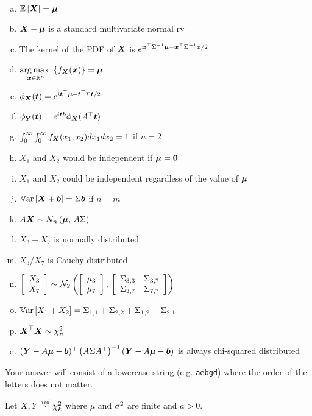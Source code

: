 \documentclass[12pt,landscape]{article}
\newcommand{\instr}{\small Your answer will consist of a lowercase string (e.g. \texttt{aebgd}) where the order of the letters does not matter. \normalsize}
\begin{document}
\begin{enumerate}[(a)]
\item $\mathbb{E}\left[\boldsymbol{X}\right] = \boldsymbol{\mu}$
\item $\boldsymbol{X} - \boldsymbol{\mu}$ is a standard multivariate normal rv
\item The kernel of the PDF of $\boldsymbol{X}$ is $e^{\boldsymbol{x}^\top \Sigma^{-1} \boldsymbol{\mu} - \boldsymbol{x}^\top \Sigma^{-1} \boldsymbol{x} / 2}$
\item $\displaystyle\operatorname*{arg\,max~}_{\boldsymbol{x} \in \mathbb{R}^n}\left\{f_{\boldsymbol{X}}(\boldsymbol{x})\right\} = \boldsymbol{\mu}$
\item $\phi_{\boldsymbol{X}}(\boldsymbol{t}) = e^{i\boldsymbol{t}^\top \boldsymbol{\mu} - \boldsymbol{t}^\top \Sigma \boldsymbol{t} / 2}$
\item $\phi_{\boldsymbol{Y}}(\boldsymbol{t}) = e^{i\boldsymbol{t} \boldsymbol{b}} \phi_{\boldsymbol{X}}(A^\top\boldsymbol{t})$
\item $\int_0^\infty \int_0^\infty f_{\boldsymbol{X}}(x_1,x_2) dx_1 dx_2 = 1$ if $n=2$
\item $X_1$ and $X_2$ would be independent if $\boldsymbol{\mu} = \boldsymbol{0}$
\item $X_1$ and $X_2$ could be independent regardless of the value of $\boldsymbol{\mu}$
\item $\mathbb{V}\text{ar}\left[\boldsymbol{X} + \boldsymbol{b}\right] = \Sigma\boldsymbol{b}$ if $n=m$
\item $A\boldsymbol{X} \sim \mathcal{N}_{n}\left(\boldsymbol{\mu},\,A\Sigma\right)$
\item $X_3 + X_7$ is normally distributed
\item $X_3 / X_7$ is Cauchy distributed
\item $\left[\begin{array}{c} X_3 \\ X_7 \end{array}\right] \sim \mathcal{N}_{2}\left(\left[\begin{array}{c} \mu_3 \\ \mu_7 \end{array}\right],\,\left[\begin{array}{cc} \Sigma_{3,3} & \Sigma_{3,7} \\ \Sigma_{3,7} & \Sigma_{7,7} \end{array}\right]\right)$
\item $\mathbb{V}\text{ar}\left[X_1 + X_2\right] = \Sigma_{1,1} + \Sigma_{2,2} + \Sigma_{1,2} + \Sigma_{2,1}$
\item $\boldsymbol{X}^\top \boldsymbol{X} \sim \chi^2_{n}$
\item $(\boldsymbol{Y} - A\boldsymbol{\mu} - \boldsymbol{b})^\top \left(A \Sigma A^\top\right)^{-1} (\boldsymbol{Y} - A\boldsymbol{\mu} - \boldsymbol{b})$ is always chi-squared distributed
\end{enumerate}
\eenum\instr\pagebreak


\problem{} Let $X, Y \iid \chisq{k}$ where $\mu$ and $\sigma^2$ are finite and $a>0$.

\vspace{-0.2cm}\benum{} 
\end{document}
